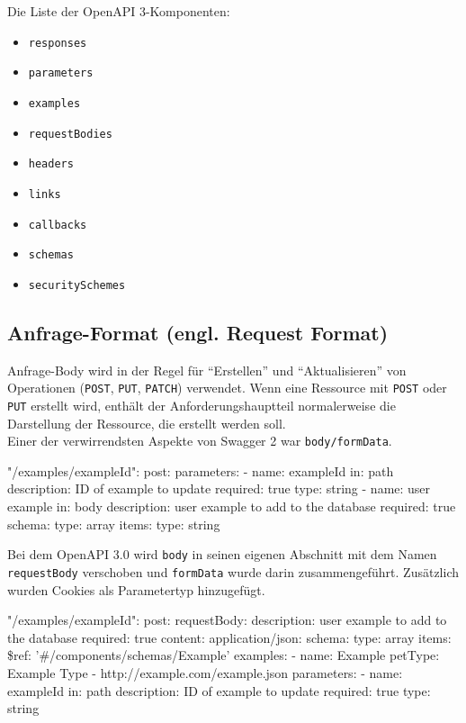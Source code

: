 Die Liste der OpenAPI 3-Komponenten:

\begin{itemize}
	\item \texttt{responses}
	\item \texttt{parameters}
	\item \texttt{examples}
	\item \texttt{requestBodies}
	\item \texttt{headers}
	\item \texttt{links}
	\item \texttt{callbacks}
	\item \texttt{schemas}
	\item \texttt{securitySchemes}\\	
\end{itemize}

\subsection{Anfrage-Format (engl. Request Format)}

Anfrage-Body wird in der Regel für "`Erstellen"' und "`Aktualisieren"' von Operationen (\texttt{POST}, \texttt{PUT}, \texttt{PATCH}) verwendet. Wenn eine Ressource mit \texttt{POST} oder \texttt{PUT} erstellt wird, enthält der Anforderungshauptteil normalerweise die Darstellung der Ressource, die erstellt werden soll\cite{openapirequestbody17}.\\

Einer der verwirrendsten Aspekte von Swagger 2 war \texttt{body/formData}.

\begin{LaTeXCode}[caption={Swagger 2.0 - Anfrage-Format},captionpos=b, label=LaTeXCode:openapi3.0-4][numbers=none]
"/examples/{exampleId}":
post:
parameters:
- name: exampleId
in: path
description: ID of example to update
required: true
type: string
- name: user example
in: body
description: user example to add to the database
required: true
schema:
type: array
items:
type: string
\end{LaTeXCode}

Bei dem OpenAPI 3.0 wird \texttt{body} in seinen eigenen Abschnitt mit dem Namen \texttt{requestBody} verschoben und \texttt{formData} wurde darin zusammengeführt. Zusätzlich wurden Cookies als Parametertyp hinzugefügt.

\begin{LaTeXCode}[caption={Open API 3.0 - Anfrage-Format},captionpos=b, label=LaTeXCode:openapi3.0-5][numbers=none]
"/examples/{exampleId}":
post:
	requestBody:
		description: user example to add to the database
		required: true
		content:
			application/json: 
			 schema:
			  type: array
			  items:
			   \$ref: '#/components/schemas/Example'
			examples:
			 - name: Example
			   petType: Example Type
			 - http://example.com/example.json
	parameters:
	 - name: exampleId
	 in: path
	 description: ID of example to update
	 required: true
	 type: string
\end{LaTeXCode}

